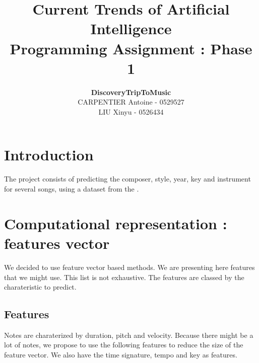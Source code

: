 \documentclass[a4paper,12pt]{article}
\author{\textbf{DiscoveryTripToMusic}\\CARPENTIER Antoine - 0529527 \\LIU Xinyu - 0526434}
\title{Current Trends of Artificial Intelligence\\ \small Programming Assignment : Phase 1}
\begin{document}
\maketitle

\section{Introduction}

The project consists of predicting the composer, style, year, key and instrument for several songs, using a dataset from the \cite{jazzomat}.

\section{Computational representation : features vector}

We decided to use feature vector based methods. We are presenting here features that we might use. This list is not exhaustive. The features are classed by the charateristic to predict.

\subsection{Features}
    Notes are charaterized by duration, pitch and velocity. Because there might be a lot of notes, we propose to use the following features to reduce the size of the feature vector. We also have the time signature, tempo and key as features.
\end{document}

